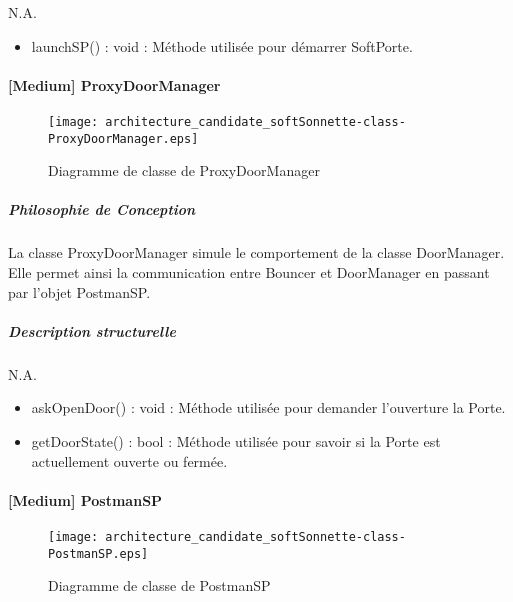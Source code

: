             N.A.
            \begin{itemize}
              \item {launchSP() : void : Méthode utilisée pour démarrer SoftPorte.}    
            \end{itemize}  

\newpage

    \paragraph{[Medium] ProxyDoorManager}

        \begin{figure} [H]
            \centering
            \texttt{[image: architecture\_candidate\_softSonnette-class-ProxyDoorManager.eps]}
            \caption{Diagramme de classe de ProxyDoorManager}
            \label{Classe-ProxyDoorManager}
        \end{figure}
    
            \subparagraph{Philosophie de Conception}%
                
            La classe ProxyDoorManager simule le comportement de la classe DoorManager. Elle permet ainsi la communication entre Bouncer et DoorManager en passant par l'objet PostmanSP.                      
            \subparagraph{Description structurelle}%
                
            N.A.
            \begin{itemize}
              \item {askOpenDoor() : void : Méthode utilisée pour demander l'ouverture la Porte.}  
              \item {getDoorState() : bool : Méthode utilisée pour savoir si la Porte est actuellement ouverte ou fermée.}    
            \end{itemize}

\newpage

    \paragraph{[Medium] PostmanSP}

        \begin{figure} [H]
            \centering
            \texttt{[image: architecture\_candidate\_softSonnette-class-PostmanSP.eps]}
            \caption{Diagramme de classe de PostmanSP}
            \label{Classe-PostmanSP}
        \end{figure}
    
